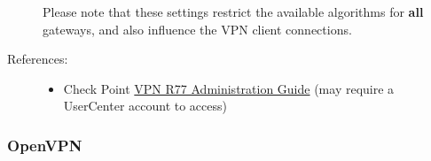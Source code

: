 \begin{description}
Please note that these settings restrict the available algorithms for
\textbf{all} gateways, and also influence the VPN client connections.



\item[References:]\mbox{}

\begin{itemize}

\item Check Point
  \href{https://sc1.checkpoint.com/documents/R77/CP_R77_VPN_AdminGuide/html_frameset.htm}{VPN
    R77 Administration Guide} (may require a
  UserCenter account to access)

\end{itemize}


\end{description}


\subsubsection{OpenVPN}

